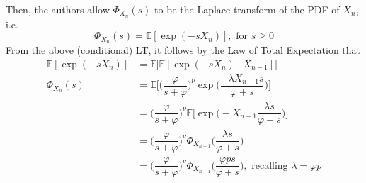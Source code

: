 \documentclass[
  letterpaper,
  DIV=11,
  numbers=noendperiod]{scrartcl}
\begin{document}
Then, the authors allow \(\Phi_{X_n}(s)\) to be the Laplace transform of
the PDF of \(X_n\), i.e. \[
\Phi_{X_n}(s) = \mathbb{E}[\exp(-sX_n)], \text{ for } s \geq 0
\] From the above (conditional) LT, it follows by the Law of Total
Expectation that \[
\begin{aligned}
\mathbb{E}[\exp(-sX_n)] &= \mathbb{E}\Big[ \mathbb{E}[\exp(-sX_n) \mid X_{n-1}] \Big] \\
\Phi_{X_n}(s) &= \mathbb{E}\Big[ \Big(\dfrac{\varphi}{s + \varphi}\Big)^\nu\exp\Big( \dfrac{-\lambda X_{n-1} s}{\varphi + s} \Big) \Big] \\
&=  \Big(\dfrac{\varphi}{s + \varphi}\Big)^\nu\mathbb{E}\Big[\exp\Big( -X_{n-1} \dfrac{\lambda  s}{\varphi + s} \Big) \Big] \\
&=  \Big(\dfrac{\varphi}{s + \varphi}\Big)^\nu\Phi_{X_{n-1}} \Big( \dfrac{\lambda  s}{\varphi + s} \Big) \\
&=  \Big(\dfrac{\varphi}{s + \varphi}\Big)^\nu \Phi_{X_{n-1}} \Big( \dfrac{\varphi p  s}{\varphi + s} \Big), \text{ recalling } \lambda = \varphi p
\end{aligned}
\]
\end{document}
